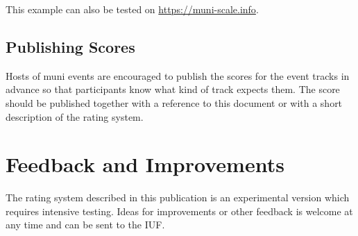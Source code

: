 \documentclass[a4paper,oneside]{scrartcl}
\begin{document}
This example can also be tested on \url{https://muni-scale.info}.

\subsection{Publishing Scores}
Hosts of muni events are encouraged to publish the scores for the event tracks
in advance so that participants know what kind of track expects them.
The score should be published together with a reference to this document or with a
short description of the rating system.

\section{Feedback and Improvements}
The rating system described in this publication is an experimental version which
requires intensive testing. Ideas for improvements or other feedback is welcome
at any time and can be sent to the IUF.
\end{document}
